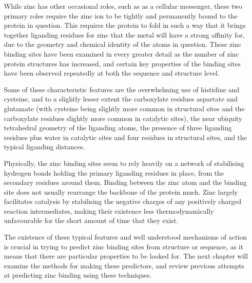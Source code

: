 While zinc has other occasional roles, such as as a cellular messenger, these two primary roles require the zinc ion to be tightly and permanently bound to the protein in question. This requires the protein to fold in such a way that it brings together liganding residues for zinc that the metal will have a strong affinity for, due to the geometry and chemical identity of the atoms in question. These zinc binding sites have been examined in every greater detail as the number of zinc protein structures has increased, and certain key properties of the binding sites have been observed repeatedly at both the sequence and structure level.

Some of these characteristic features are the overwhelming use of histidine and cysteine, and to a slightly lesser extent the carboxylate residues aspartate and glutamate (with cysteine being slightly more common in structural sites and the carboxylate residues slightly more common in catalytic sites), the near ubiquity tetrahedral geometry of the liganding atoms, the presence of three liganding residues plus water in catalytic sites and four residues in structural sites, and the typical liganding distances.

Physically, the zinc binding sites seem to rely heavily on a network of stabilising hydrogen bonds holding the primary liganding residues in place, from the secondary residues around them. Binding between the zinc atom and the binding site does not usually rearrange the backbone of the protein much. Zinc largely facilitates catalysis by stabilising the negative charges of any positively charged reaction intermediates, making their existence less thermodynamically unfavourable for the short amount of time that they exist.

The existence of these typical features and well understood mechanisms of action is crucial in trying to predict zinc binding sites from structure or sequence, as it means that there are particular properties to be looked for. The next chapter will examine the methods for making these predictors, and review previous attempts at predicting zinc binding using these techniques.


